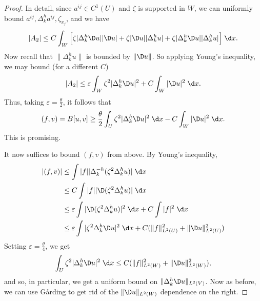 \documentclass[a4paper]{article}
\begin{document}
\begin{proof}
  In detail, since $a^{ij} \in C^1(U)$ and $\zeta$ is supported in $W$, we can uniformly bound $a^{ij}, \Delta_k^h a^{ij}, \zeta_{x_j}$, and we have
  \[
    |A_2| \leq C \int_W \Big[\zeta |\Delta^h_k \D u| |\D u| + \zeta |\D u| |\Delta_k^h u| + \zeta |\Delta^h_k \D u| |\Delta^h_k u|\Big]\;\d x.
  \]
  Now recall that $\|\Delta^h_k u\|$ is bounded by $\|\D u\|$. So applying Young's inequality, we may bound (for a different $C$)
  \[
    |A_2| \leq \varepsilon \int_W \zeta^2 |\Delta_k^h \D u|^2 + C \int_W |\D u|^2\;\d x.
  \]
  Thus, taking $\varepsilon = \frac{\theta}{2}$, it follows that
  \[
    (f, v) = B[u, v] \geq \frac{\theta}{2} \int_U \zeta^2 |\Delta_k^h \D u|^2 \;\d x - C \int_W |\D u|^2\;\d x.
  \]
  This is promising.

  It now suffices to bound $(f, v)$ from above. By Young's inequality,
  \begin{align*}
    |(f, v)| &\leq \int |f| |\Delta^{-h}_k (\zeta^2 \Delta_k^h u)|\;\d x\\
    &\leq C \int |f| |\D (\zeta^2 \Delta_k^h u)|\;\d x\\
    &\leq \varepsilon \int |\D (\zeta^2 \Delta_k^h u)|^2\;\d x + C \int |f|^2\;\d x\\
    &\leq \varepsilon \int |\zeta^2 \Delta_k^h \D u|^2\;\d x + C (\|f\|_{L^2(U)}^2 + \|\D u\|_{L^2(U)}^2)
  \end{align*}
%
  Setting $\varepsilon = \frac{\theta}{4}$, we get
  \[
    \int_U \zeta^2 |\Delta_k^h \D u|^2 \;\d x \leq C (\|f\|_{L^2(W)}^2 + \|\D u\|_{L^2(W)}^2),
  \]
  and so, in particular, we get a uniform bound on $\|\Delta_k^h \D u\|_{L^2(V)}$. Now as before, we can use G\r{a}rding to get rid of the $\|\D u\|_{L^2(W)}$ dependence on the right.


\end{proof}
\end{document}
